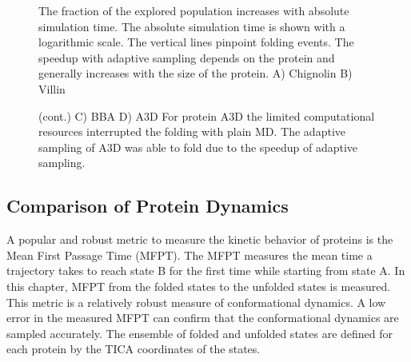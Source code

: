 \begin{figure}[H]
\centering
   \begin{subfigure}[b]{0.6\linewidth}
   {}
   \end{subfigure}%
   
   \begin{subfigure}[b]{0.6\linewidth}
   {}
   \end{subfigure}%


  \caption{The fraction of the explored population increases with absolute simulation time. The absolute simulation time is shown with a logarithmic scale. The vertical lines pinpoint folding events. The speedup with adaptive sampling depends on the protein and generally increases with the size of the protein. A) Chignolin B) Villin }
\end{figure}

\begin{figure}[H]\ContinuedFloat
\centering
   \begin{subfigure}[b]{0.6\linewidth}
   {}
    \end{subfigure}%

   \begin{subfigure}[b]{0.6\linewidth}
   {}
    \end{subfigure}%
  \caption{(cont.)  C) BBA D) A3D For protein A3D the limited computational resources interrupted the folding with plain MD. The adaptive sampling of A3D was able to fold due to the speedup of adaptive sampling.}
  \label{fig:Pop_explored}
\end{figure}





\subsection{\label{sec:kinetics}Comparison of Protein Dynamics}



A popular and robust metric to measure the kinetic behavior of proteins is the Mean First Passage Time (MFPT). The MFPT measures the mean time a trajectory takes to reach state B for the first time while starting from state A. In this chapter, MFPT from the folded states to the unfolded states is measured. This metric is a relatively robust measure of conformational dynamics. A low error in the measured MFPT can confirm that the conformational dynamics are sampled accurately. The ensemble of folded and unfolded states are defined for each protein by the TICA coordinates of the states. 

